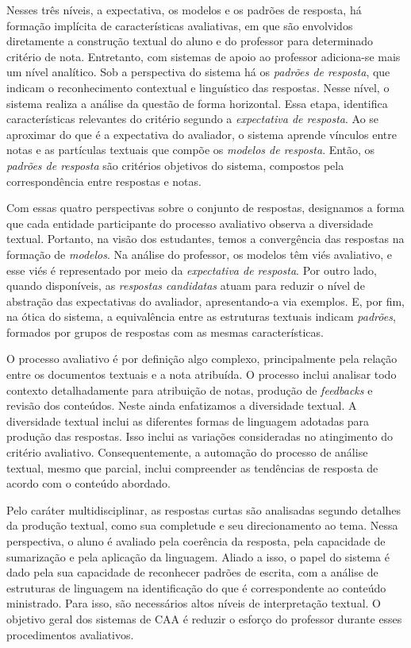 Nesses três níveis, a expectativa, os modelos e os padrões de resposta, há formação implícita de características avaliativas, em que são envolvidos diretamente a construção textual do aluno e do professor para determinado critério de nota. Entretanto, com sistemas de apoio ao professor adiciona-se mais um nível analítico. Sob a perspectiva do sistema há os \textit{padrões de resposta}, que indicam o reconhecimento contextual e linguístico das respostas. Nesse nível, o sistema realiza a análise da questão de forma horizontal. Essa etapa, identifica características relevantes do critério segundo a \textit{expectativa de resposta}. Ao se aproximar do que é a expectativa do avaliador, o sistema aprende vínculos entre notas e as partículas textuais que compõe os \textit{modelos de resposta}. Então, os \textit{padrões de resposta} são critérios objetivos do sistema, compostos pela correspondência entre respostas e notas.

Com essas quatro perspectivas sobre o conjunto de respostas, designamos a forma que cada entidade participante do processo avaliativo observa a diversidade textual. Portanto, na visão dos estudantes, temos a convergência das respostas na formação de \textit{modelos}. Na análise do professor, os modelos têm viés avaliativo, e esse viés é representado por meio da \textit{expectativa de resposta}. Por outro lado, quando disponíveis, as \textit{respostas candidatas} atuam para reduzir o nível de abstração das expectativas do avaliador, apresentando-a via exemplos.  E, por fim, na ótica do sistema, a equivalência entre as estruturas textuais indicam \textit{padrões}, formados por grupos de respostas com as mesmas características.

O processo avaliativo é por definição algo complexo, principalmente pela relação entre os documentos textuais e a nota atribuída. O processo inclui analisar todo contexto detalhadamente para atribuição de notas, produção de \textit{feedbacks} e revisão dos conteúdos. Neste ainda enfatizamos a diversidade textual. A diversidade textual inclui as diferentes formas de linguagem adotadas para produção das respostas. Isso inclui as variações consideradas no atingimento do critério avaliativo. Consequentemente, a automação do processo de análise textual, mesmo que parcial, inclui compreender as tendências de resposta de acordo com o conteúdo abordado. 

Pelo caráter multidisciplinar, as respostas curtas são analisadas segundo detalhes da produção textual, como sua completude e seu direcionamento ao tema. Nessa perspectiva, o aluno é avaliado pela coerência da resposta, pela capacidade de sumarização e pela aplicação da linguagem. Aliado a isso, o papel do sistema é dado pela sua capacidade de reconhecer padrões de escrita, com a análise de estruturas de linguagem na identificação do que é correspondente ao conteúdo ministrado. Para isso, são necessários altos níveis de interpretação textual. O objetivo geral dos sistemas de CAA é reduzir o esforço do professor durante esses procedimentos avaliativos. 

